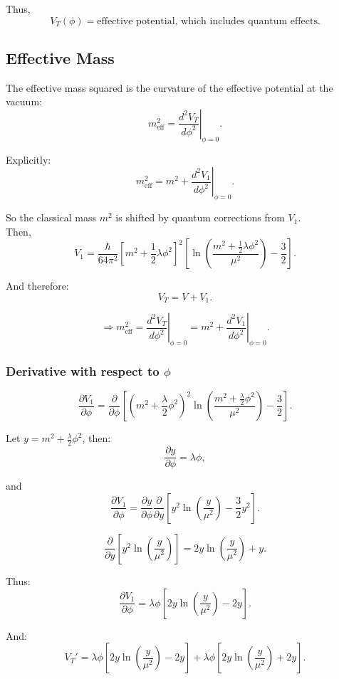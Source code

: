 \documentclass[14pt]{article} %
\begin{document}
Thus,
\[
V_T(\phi) = \text{effective potential, which includes quantum effects}.
\]

\subsection{Effective Mass}

The effective mass squared is the curvature of the effective potential at the vacuum:
\[
m_{\text{eff}}^2 = \left.\frac{d^2 V_T}{d\phi^2}\right|_{\phi=0}.
\]

Explicitly:
\[
m_{\text{eff}}^2 = m^2 + \left.\frac{d^2 V_1}{d\phi^2}\right|_{\phi=0}.
\]

So the classical mass \(m^2\) is shifted by quantum corrections from \(V_1\). \\
Then,
\[
V_1 = \frac{\hbar}{64 \pi^2} 
\left[ m^2 + \frac{1}{2} \lambda \phi^2 \right]^2
\left[
\ln\!\left( \frac{m^2 + \frac{1}{2} \lambda \phi^2}{\mu^2} \right)
- \frac{3}{2}
\right].
\]

And therefore:
\[
V_T = V + V_1.
\]

\[
\Rightarrow m_{\text{eff}}^2 = 
\left. \frac{d^2 V_T}{d\phi^2} \right|_{\phi=0}
= m^2 + \left. \frac{d^2 V_1}{d\phi^2} \right|_{\phi=0}.
\]
\subsubsection*{Derivative with respect to $\phi$}

\[
\frac{\partial V_1}{\partial \phi}
= \frac{\partial}{\partial \phi} \left[
\left( m^2 + \frac{\lambda}{2} \phi^2 \right)^2
\ln\!\left( \frac{m^2 + \frac{\lambda}{2} \phi^2}{\mu^2} \right)
- \frac{3}{2}
\right].
\]

Let $y = m^2 + \frac{\lambda}{2} \phi^2$, then:
\[
\frac{\partial y}{\partial \phi} = \lambda \phi,
\]

and
\[
\frac{\partial V_1}{\partial \phi}
= \frac{\partial y}{\partial \phi}
\frac{\partial}{\partial y}
\left[
y^2 \ln\!\left( \frac{y}{\mu^2} \right) - \frac{3}{2} y^2
\right].
\]

\[
\frac{\partial}{\partial y} \left[ y^2 \ln\!\left( \frac{y}{\mu^2} \right) \right]
= 2 y \ln\!\left( \frac{y}{\mu^2} \right) + y.
\]

Thus:
\[
\frac{\partial V_1}{\partial \phi}
= \lambda \phi \left[
2 y \ln\!\left( \frac{y}{\mu^2} \right) - 2 y
\right].
\]

And:
\[
V_T' = \lambda \phi 
\left[
2 y \ln\!\left( \frac{y}{\mu^2} \right) - 2 y
\right]
+ \lambda \phi \left[
2 y \ln\!\left( \frac{y}{\mu^2} \right) + 2 y
\right].
\]
\end{document}
